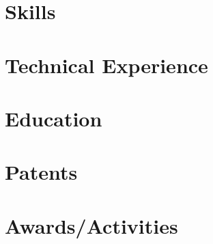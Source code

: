 \documentclass[letter,10pt]{article}
\begin{document}
% 

\section{Skills}


\section{Technical Experience}


\section{Education}


\section{Patents}


\section{Awards/Activities}

\end{document}
